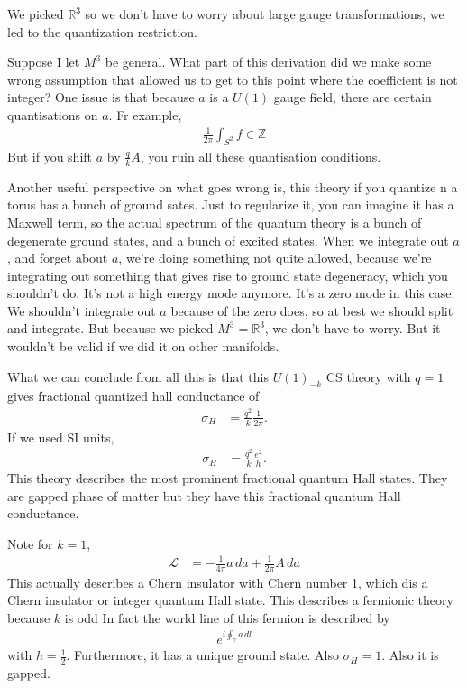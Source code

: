 We picked $\mathbb{R}^3$ so we don't have to worry about large gauge
transformations,
we led to the quantization restriction.

Suppose I let $M^3$ be general.
What part of this derivation did we make some wrong assumption that allowed us
to get to this point where the coefficient is not integer?
One issue is that because $a$ is a $U(1)$ gauge field,
there are certain quantisations on $a$.
Fr example,
\begin{align}
    \frac{1}{2\pi}\int_{S^2} f \in \mathbb{Z}
\end{align}
But if you shift $a$ by $\frac{q}{k}A$,
you ruin all these quantisation conditions.

Another useful perspective on what goes wrong is,
this theory if you quantize n a torus has a bunch of ground sates.
Just to regularize it,
you can imagine it has a Maxwell term,
so the actual spectrum of the quantum theory
is a bunch of degenerate ground states,
and a bunch of excited states.
When we integrate out $a$,
and forget about $a$,
we're doing something not quite allowed,
because we're integrating out something that gives rise to ground state
degeneracy,
which you shouldn't do.
It's not a high energy mode anymore.
It's a zero mode in this case.
We shouldn't integrate out $a$
because of the zero does,
so at best we should split and integrate.
But because we picked $M^3=\mathbb{R}^3$,
we don't have to worry.
But it wouldn't be valid if we did it on other manifolds.

What we can conclude from all this is that this $U(1)_{-k}$
CS theory with $q=1$
gives fractional quantized hall conductance of
\begin{align}
    \sigma_H &=
    \frac{q^2}{k}\frac{1}{2\pi}.
\end{align}
If we used SI units,
\begin{align}
    \sigma_H &=
    \frac{q^2}{k} \frac{e^2}{h}.
\end{align}
This theory describes the most prominent fractional quantum Hall states.
They are gapped phase of matter but they have this fractional quantum Hall
conductance.

Note for $k=1$,
\begin{align}
    \mathcal{L}
    &=
    -\frac{1}{4\pi} a\, da
    +
    \frac{1}{2\pi} A\, da
\end{align}
This actually describes a Chern insulator with Chern number 1,
which dis a Chern insulator or integer quantum Hall state.
This describes a fermionic theory because $k$ is odd
In fact the world line of this fermion is described by
\begin{align}
    e^{i\oint_{\gamma} a\, dl}
\end{align}
with $h=\frac{1}{2}$.
Furthermore,
it has a unique ground state.
Also  $\sigma_H=1$.
Also it is gapped.


